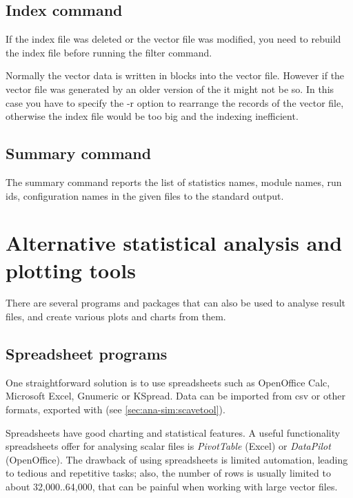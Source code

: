 \subsection{Index command}

If the index file was deleted or the vector file was modified, you need to
rebuild the index file before running the filter command.

Normally the vector data is written in blocks into the vector file.
However if the vector file was generated by an older version of the
 it might not be so. In this case you have
to specify the -r option to rearrange the records of the vector file,
otherwise the index file would be too big and the indexing inefficient.

\subsection{Summary command}

The summary command reports the list of statistics names, module names,
run ids, configuration names in the given files to the standard output.



\section{Alternative statistical analysis and plotting tools}

There are several programs and packages that can also be used to analyse
result files, and create various plots and charts from them.


\subsection{Spreadsheet programs}

One straightforward solution is to use spreadsheets such as OpenOffice
Calc, Microsoft Excel, Gnumeric or KSpread. Data can be imported from csv
or other formats, exported with  (see
\ref{sec:ana-sim:scavetool}).

Spreadsheets have good charting and statistical features. A useful
functionality spreadsheets offer for analysing scalar files is
\textit{PivotTable} (Excel) or \textit{DataPilot} (OpenOffice). The
drawback of using spreadsheets is limited automation, leading to tedious
and repetitive tasks; also, the number of rows is usually limited to about
32,000..64,000, that can be painful when working with large vector files.


